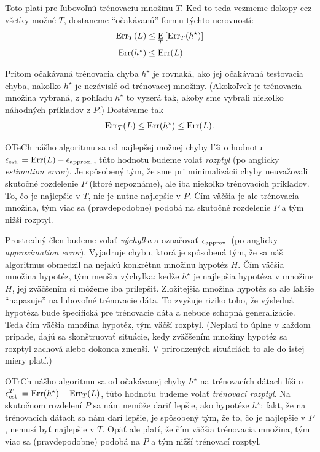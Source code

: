 Toto platí pre ľubovoľnú trénovaciu množinu $T$. Keď to teda vezmeme
dokopy cez všetky možné $T$, dostaneme ``očakávanú'' formu týchto
nerovností:
\begin{align*}
  \mathrm{Err}_T(L) &\leq \operatorname*{\mathrm{E}}_T \left[ \mathrm{Err}_T(h^\star) \right] \\
  \mathrm{Err}(h^\star) &\leq \mathrm{Err}(L)
\end{align*}

Pritom očakávaná trénovacia chyba $h^\star$ je rovnaká, ako jej očakávaná
testovacia chyba, nakoľko $h^\star$ je nezávislé od trénovacej množiny.
(Akokoľvek je trénovacia množina vybraná, z pohľadu $h^\star$ to vyzerá
tak, akoby sme vybrali niekoľko náhodných príkladov z $P$.) Dostávame tak
$$ \mathrm{Err}_T(L) \leq \mathrm{Err}(h^\star) \leq \mathrm{Err}(L). $$

OTeCh nášho algoritmu sa od najlepšej možnej chyby líši o hodnotu
${\epsilon_\text{est.}} = \mathrm{Err}(L) - {\epsilon_\text{approx.}}$, túto hodnotu budeme volať
\emph{rozptyl} (po anglicky \emph{estimation error}). Je spôsobený tým,
že sme pri minimalizácii chyby neuvažovali skutočné rozdelenie $P$
(ktoré nepoznáme), ale iba niekoľko trénovacích príkladov. To, čo je
najlepšie v $T$, nie je nutne najlepšie v $P$. Čím väčšia je ale
trénovacia množina, tým viac sa (pravdepodobne) podobá na skutočné
rozdelenie $P$ a tým nižší rozptyl.

Prostredný člen budeme volať \emph{výchylka} a označovať ${\epsilon_\text{approx.}}$
(po anglicky \emph{approximation error}). Vyjadruje chybu, ktorá je spôsobená tým,
že sa náš algoritmus obmedzil na nejakú konkrétnu množinu hypotéz $H$.
Čím väčšia množina hypotéz, tým menšia výchylka: kedže $h^\star$ je
najlepšia hypotéza v množine $H$, jej zväčšením si môžeme iba prilepšiť.
Zložitejšia množina hypotéz sa ale ľahšie ``napasuje'' na ľubovoľné
trénovacie dáta. To zvyšuje riziko toho, že výsledná hypotéza bude
špecifická pre trénovacie dáta a nebude schopná generalizácie. Teda
čím väčšia množina hypotéz, tým väčší rozptyl. (Neplatí to úplne
v každom prípade, dajú sa skonštruovať situácie, kedy zväčšením
množiny hypotéz sa rozptyl zachová alebo dokonca zmenší. V prirodzených
situáciách to ale do istej miery platí.)

OTrCh nášho algoritmu sa od očakávanej chyby $h^\star$ na trénovacích
dátach líši o ${\epsilon^T_\text{est.}} = \mathrm{Err}(h^\star) - \mathrm{Err}_T(L)$, túto hodnotu
budeme volať \emph{trénovací rozptyl}. Na skutočnom rozdelení $P$ sa
nám nemôže dariť lepšie, ako hypotéze $h^\star$; fakt, že na trénovacích
dátach sa nám darí lepšie, je spôsobený tým, že to, čo je najlepšie
v $P$, nemusí byť najlepšie v $T$. Opäť ale platí, že čím väčšia
trénovacia množina, tým viac sa (pravdepodobne) podobá na $P$ a
tým nižší trénovací rozptyl.

